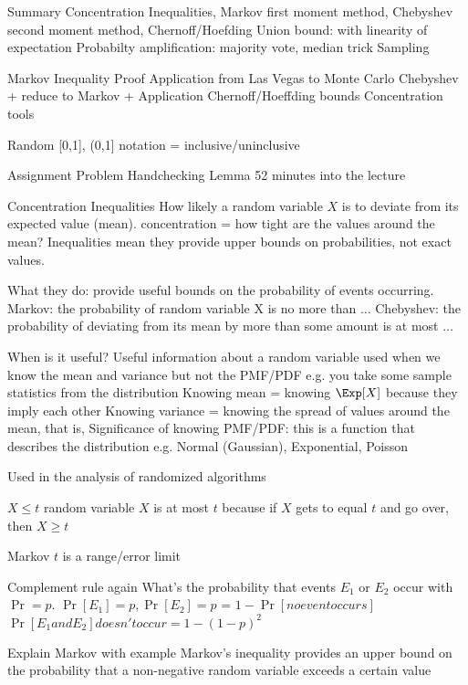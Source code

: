 
Summary
Concentration Inequalities, Markov first moment method, Chebyshev second moment method, Chernoff/Hoefding
Union bound: with linearity of expectation
Probabilty amplification: majority vote, median trick
Sampling



Markov Inequality Proof
Application from Las Vegas to Monte Carlo 
Chebyshev + reduce to Markov + Application
Chernoff/Hoeffding bounds
Concentration tools


Random
[0,1], (0,1] notation = inclusive/uninclusive

Assignment
Problem Handchecking Lemma 52 minutes into the lecture

Concentration Inequalities
How likely a random variable $X$ is to deviate from its expected value (mean).
concentration = how tight are the values around the mean?
Inequalities mean they provide upper bounds on probabilities, not exact values.

What they do: provide useful bounds on the probability of events occurring.
Markov: the probability of random variable X is no more than $\dots$
Chebyshev: the probability of deviating from its mean by more than some amount is at most $\dots$

When is it useful?
Useful information about a random variable
used when we know the mean and variance but not the PMF/PDF e.g. you take some sample statistics from the distribution
Knowing mean = knowing $\Exp[X]$ because they imply each other
Knowing variance = knowing the spread of values around the mean, that is, 
Significance of knowing PMF/PDF: this is a function that describes the distribution e.g. Normal (Gaussian), Exponential, Poisson

Used in the analysis of randomized algorithms

$X \leq t$ random variable $X$ is at most $t$ because if $X$ gets to equal $t$ and go over, then $X \geq t$

Markov
$t$ is a range/error limit

Complement rule again
What's the probability that events $E_1$ or $E_2$ occur with $\Pr = p$.
$\Pr[E_1] = p,\Pr[E_2] = p$
=
$1 - \Pr[no event occurs]$
$\Pr[E_1 and E_2] doesn't occur = 1 - (1-p)^2$


Explain Markov with example
Markov's inequality provides an upper bound on the probability that a non-negative random variable exceeds a certain value

